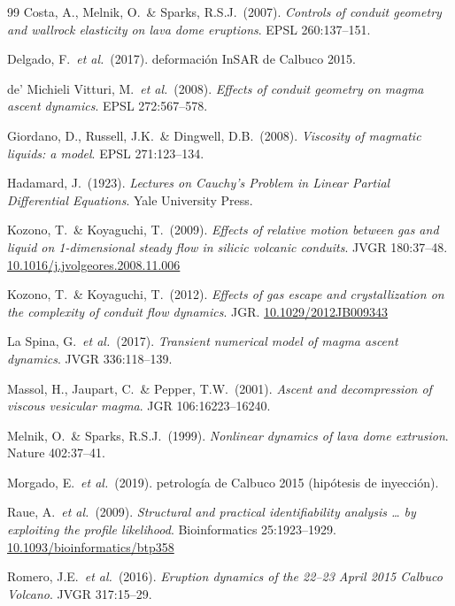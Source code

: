 \documentclass[11pt,a4paper]{article}
\theoremstyle{plain}
\theoremstyle{definition}
\theoremstyle{remark}
\begin{document}
\begin{thebibliography}{99}
 Costa, A., Melnik, O.\ \& Sparks, R.S.J.\ (2007).
  \emph{Controls of conduit geometry and wallrock elasticity on lava
  dome eruptions}. EPSL 260:137--151.

 Delgado, F.\ \emph{et al.}\ (2017).
  deformación InSAR de Calbuco 2015.

 de' Michieli Vitturi, M.\ \emph{et al.}\ (2008).
  \emph{Effects of conduit geometry on magma ascent dynamics}.
  EPSL 272:567--578.

 Giordano, D., Russell, J.K.\ \& Dingwell, D.B.\ (2008).
  \emph{Viscosity of magmatic liquids: a model}. EPSL 271:123--134.

 Hadamard, J.\ (1923).
  \emph{Lectures on Cauchy's Problem in Linear Partial Differential
  Equations}. Yale University Press.

 Kozono, T.\ \& Koyaguchi, T.\ (2009).
  \emph{Effects of relative motion between gas and liquid on
  1-dimensional steady flow in silicic volcanic conduits}.
  JVGR 180:37--48.
  \href{https://doi.org/10.1016/j.jvolgeores.2008.11.006}{10.1016/j.jvolgeores.2008.11.006}

 Kozono, T.\ \& Koyaguchi, T.\ (2012).
  \emph{Effects of gas escape and crystallization on the complexity
  of conduit flow dynamics}. JGR.
  \href{https://doi.org/10.1029/2012JB009343}{10.1029/2012JB009343}

 La Spina, G.\ \emph{et al.}\ (2017).
  \emph{Transient numerical model of magma ascent dynamics}.
  JVGR 336:118--139.

 Massol, H., Jaupart, C.\ \& Pepper, T.W.\ (2001).
  \emph{Ascent and decompression of viscous vesicular magma}.
  JGR 106:16223--16240.

 Melnik, O.\ \& Sparks, R.S.J.\ (1999).
  \emph{Nonlinear dynamics of lava dome extrusion}. Nature 402:37--41.

 Morgado, E.\ \emph{et al.}\ (2019).
  petrología de Calbuco 2015 (hipótesis de inyección).

 Raue, A.\ \emph{et al.}\ (2009).
  \emph{Structural and practical identifiability analysis \ldots
  by exploiting the profile likelihood}. Bioinformatics 25:1923--1929.
  \href{https://doi.org/10.1093/bioinformatics/btp358}{10.1093/bioinformatics/btp358}

 Romero, J.E.\ \emph{et al.}\ (2016).
  \emph{Eruption dynamics of the 22--23 April 2015 Calbuco Volcano}.
  JVGR 317:15--29.


\end{thebibliography}
\end{document}
